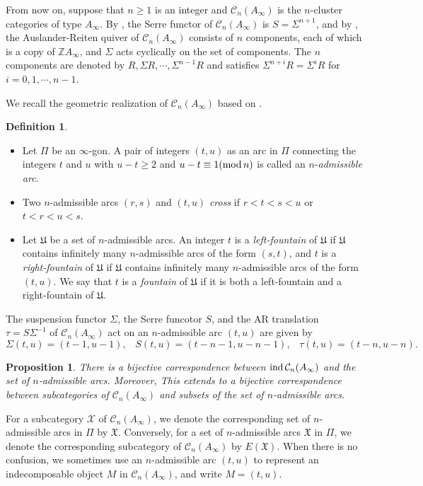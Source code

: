 \documentclass[a4paper,reqno,11pt]{amsart}
\newtheorem{proposition}[theorem]{Proposition}
\theoremstyle{definition}
\newtheorem{definition}[theorem]{Definition}
\def\C{\mathcal{C}}
\renewcommand{\mod}{\mathop{\rm mod}\nolimits}%
\providecommand{\ind}{\mathop{\rm ind}\nolimits}%
\begin{document}
From now on, suppose that $n\geq1$ is an integer and $\C_n(A_{\infty})$ is the $n$-cluster categories of type $A_{\infty}$. By \cite[Proposition 1.8]{HJY}, the Serre functor of $\C_n(A_{\infty})$ is $S=\Sigma^{n+1}$, and by \cite[Proposition 1.10]{HJY}, the Auslander-Reiten quiver  of $\C_n(A_{\infty})$
consists of $n$ components, each of which is a copy of $\mathbb{Z}A_{\infty}$, and $\Sigma$ acts cyclically
on the set of components. The $n$ components are denoted by $R,\Sigma R,\cdots,\Sigma^{n-1} R$ and satisfies $\Sigma^{n+i} R=\Sigma^{i} R$ for $i=0,1,\cdots,n-1$.

We recall the geometric realization of $\C_n(A_{\infty})$ based on \cite{HJ1}.
\begin{definition}
\begin{itemize}
  \item[(1)] Let $\Pi$ be an $\infty$-gon. A pair of integers $(t, u)$ as an arc in $\Pi$
connecting the integers $t$ and $u$ with $u-t\geq2$ and $u-t\equiv 1(\mod n)$ is
called an $n$-\emph{admissible arc}.
  \item[(2)] Two  $n$-admissible arcs $(r, s)$ and $(t, u)$ \emph{cross} if $r<t<s<u$ or $t<r<u<s$.
  \item[(3)] Let $\mathfrak{U}$ be a set of $n$-admissible arcs. An integer $t$ is a \emph{left-fountain} of $\mathfrak{U}$ if $\mathfrak{U}$ contains infinitely many $n$-admissible arcs of the form $(s, t)$, and $t$ is a \emph{right-fountain} of $\mathfrak{U}$ if $\mathfrak{U}$ contains infinitely many $n$-admissible arcs of the form $(t, u)$. We say that $t$ is a \emph{fountain} of $\mathfrak{U}$ if it is both a left-fountain and a right-fountain of $\mathfrak{U}$.
\end{itemize}
\end{definition}
The suspension functor $\Sigma$, the Serre funcotor $S$, and the AR translation $\tau=S\Sigma^{-1}$ of $\C_n(A_{\infty})$ act on an $n$-admissible arc $(t, u)$ are given by
$$\Sigma(t, u)=(t-1,u-1),\;\;\;S(t, u)=(t-n-1,u-n-1),\;\;\;\tau(t, u)=(t-n,u-n).$$

\begin{proposition}\cite[Proposition 2.4]{HJ1}
There is a bijective correspondence between $\ind \C_n(A_{\infty})$ and the set of $n$-admissible arcs. Moreover, This extends to a bijective correspondence between subcategories of $\C_n(A_{\infty})$ and subsets of the set of $n$-admissible arcs.
\end{proposition}

For a subcategory $\mathcal{X}$ of $\mathcal{C}_n(A_{\infty})$, we denote the corresponding set of $n$-admissible arcs in $\Pi$ by $\mathfrak{X}$. Conversely, for a set of $n$-admissible arcs $\mathfrak{X}$ in $\Pi$, we denote the corresponding subcategory of $\mathcal{C}_n(A_{\infty})$ by $E(\mathfrak{X})$. When there is no confusion, we sometimes use an $n$-admissible arc $(t, u)$ to represent an indecomposable object $M$ in $\mathcal{C}_n(A_{\infty})$, and write $M = (t, u)$.
\end{document}

